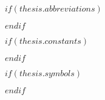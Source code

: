 \renewcommand{\listtablename}{Índice de Tablas}
\listoftables %
% 
$if(thesis.abbreviations)$



$endif$

$if(thesis.constants)$



$endif$


$if(thesis.symbols)$



$endif$


\mainmatter

\pagestyle{thesis} %

\sloppy %


